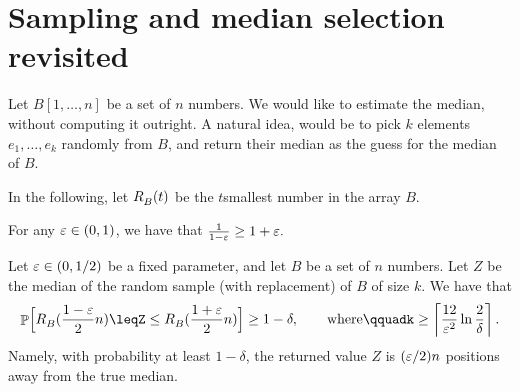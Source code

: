 
\section{Sampling and median selection revisited}

Let $B[1,\ldots, n]$ be a set of $n$ numbers. We would like to
estimate the median, without computing it outright. A natural idea,
would be to pick $k$ elements $e_1, \ldots, e_k$ randomly from $B$,
and return their median as the guess for the median of $B$.

\providecommand{\rankY}[2]{{R^{}_{#1}}\pth{#2}}%

In the following, let $\rankY{B}{t}$ be the $t$\th smallest number in
the array $B$.

\begin{observation}
    For any ${\varepsilon} \in (0,1)$, we have that
    \begin{math}
        \frac{1}{1-{\varepsilon}} \geq 1+{\varepsilon}.
    \end{math}
\end{observation}

\begin{lemma}
    Let ${\varepsilon} \in (0,1/2)$ be a fixed parameter, and let $B$ be a set
    of $n$ numbers. Let $Z$ be the median of the random sample (with
    replacement) of $B$ of size $k$.  We have that
    \begin{equation*}
        \Prob{\Bigl. \rankY{B}{ \smash{\frac{1-\eps}{2}{n}}
           }
           \leq%
           Z%
           \leq%
           \rankY{B}{ \smash{\frac{1+\eps}{2} n}}%
        }
        \geq%
        1-\delta,
        \qquad\text{where}\qquad%
        k\geq \ceil{\frac{12}{ \eps^2} \ln \frac{2}{\delta}}.
    \end{equation*}
    Namely, with probability at least $1-\delta$, the returned value
    $Z$ is $({\varepsilon}/2)n$ positions away from the true median.
\end{lemma}

